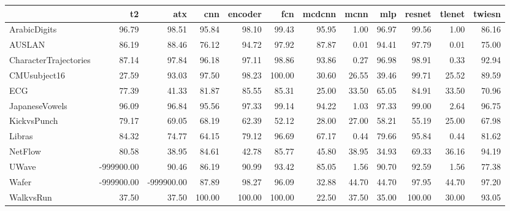 \begin{tabular}{lrrrrrrrrrrr}
\hline
                       &         t2 &        atx &    cnn &   encoder &    fcn &   mcdcnn &   mcnn &   mlp &   resnet &   tlenet &   twiesn \\
\hline
 ArabicDigits          &      96.79 &      98.51 &  95.84 &     98.10 &  99.43 &    95.95 &   1.00 & 96.97 &    99.56 &     1.00 &    86.16 \\
 AUSLAN                &      86.19 &      88.46 &  76.12 &     94.72 &  97.92 &    87.87 &   0.01 & 94.41 &    97.79 &     0.01 &    75.00 \\
 CharacterTrajectories &      87.14 &      97.84 &  96.18 &     97.11 &  98.86 &    93.86 &   0.27 & 96.98 &    98.91 &     0.33 &    92.94 \\
 CMUsubject16          &      27.59 &      93.03 &  97.50 &     98.23 & 100.00 &    30.60 &  26.55 & 39.46 &    99.71 &    25.52 &    89.59 \\
 ECG                   &      77.39 &      41.33 &  81.87 &     85.55 &  85.31 &    25.00 &  33.50 & 65.05 &    84.91 &    33.50 &    70.96 \\
 JapaneseVowels        &      96.09 &      96.84 &  95.56 &     97.33 &  99.14 &    94.22 &   1.03 & 97.33 &    99.00 &     2.64 &    96.75 \\
 KickvsPunch           &      79.17 &      69.05 &  68.19 &     62.39 &  52.12 &    28.00 &  27.00 & 58.21 &    55.19 &    25.00 &    67.98 \\
 Libras                &      84.32 &      74.77 &  64.15 &     79.12 &  96.69 &    67.17 &   0.44 & 79.66 &    95.84 &     0.44 &    81.62 \\
 NetFlow               &      80.58 &      38.95 &  84.61 &     42.78 &  85.77 &    45.80 &  38.95 & 34.93 &    69.33 &    36.16 &    94.19 \\
 UWave                 & -999900.00 &      90.46 &  86.19 &     90.99 &  93.42 &    85.05 &   1.56 & 90.70 &    92.59 &     1.56 &    77.38 \\
 Wafer                 & -999900.00 & -999900.00 &  87.89 &     98.27 &  96.09 &    32.88 &  44.70 & 44.70 &    97.95 &    44.70 &    97.20 \\
 WalkvsRun             &      37.50 &      37.50 & 100.00 &    100.00 & 100.00 &    22.50 &  37.50 & 35.00 &   100.00 &    30.00 &    93.05 \\
\hline
\end{tabular}
